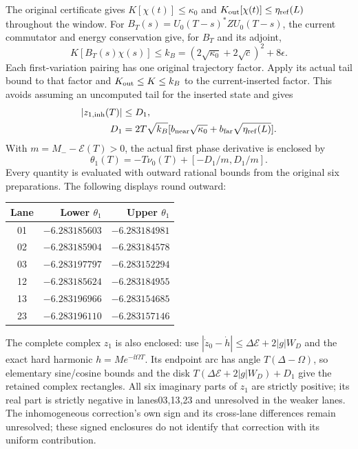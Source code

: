 The original certificate gives $K[\chi(t)]\le\kappa_0$ and
$K_{\rm out}[\chi(t)]\le\eta_{\rm ref}(L)$ throughout the window.
For $B_T(s)=U_0(T-s)^*ZU_0(T-s)$, the current commutator and energy
conservation give, for $B_T$ and its adjoint,
\[
 K[B_T(s)\chi(s)]\le k_B
  =(2\sqrt{\kappa_0}+2\sqrt c)^2+8\epsilon.
\]
Each first-variation pairing has one original trajectory factor. Apply
its actual tail bound to that factor and $K_{\rm out}\le K\le k_B$ to
the current-inserted factor. This avoids assuming an uncomputed tail for
the inserted state and gives
\[
 \begin{aligned}
 |z_{1,\rm inh}(T)|&\le D_1,\\
 D_1&=2T\sqrt{k_B}
 [b_{\rm near}\sqrt{\kappa_0}
          +b_{\rm far}\sqrt{\eta_{\rm ref}(L)}].
 \end{aligned}
\]
With $m=M_--\mathcal E(T)>0$, the actual first phase derivative is enclosed by
\[
 \theta_1(T)=-T\nu_0(T)+[-D_1/m,D_1/m].
\]
Every quantity is evaluated with outward rational bounds from the original
six preparations. The following displays round outward:
\begin{center}\small
\begin{tabular}{c rr}\toprule
Lane&Lower $\theta_1$&Upper $\theta_1$\\\midrule
01&$-6.283185603$&$-6.283184981$\\
02&$-6.283185904$&$-6.283184578$\\
03&$-6.283197797$&$-6.283152294$\\
12&$-6.283185624$&$-6.283184955$\\
13&$-6.283196966$&$-6.283154685$\\
23&$-6.283196110$&$-6.283157146$\\\bottomrule
\end{tabular}
\end{center}
The complete complex $z_1$ is also enclosed: use
$|\dot z_0-\dot h|\le\Delta\mathcal E+2|g|W_D$ and the exact hard
harmonic $h=M e^{-\ii\Omega T}$. Its endpoint arc has angle
$T(\Delta-\Omega)$, so elementary sine/cosine bounds and the disk
$T(\Delta\mathcal E+2|g|W_D)+D_1$ give the retained complex rectangles.
All six imaginary parts of $z_1$ are strictly positive; its real part is
strictly negative in lanes03,13,23 and unresolved in the weaker lanes.
The inhomogeneous correction's own sign and its cross-lane differences
remain unresolved; these signed enclosures do not identify that correction
with its uniform contribution.


